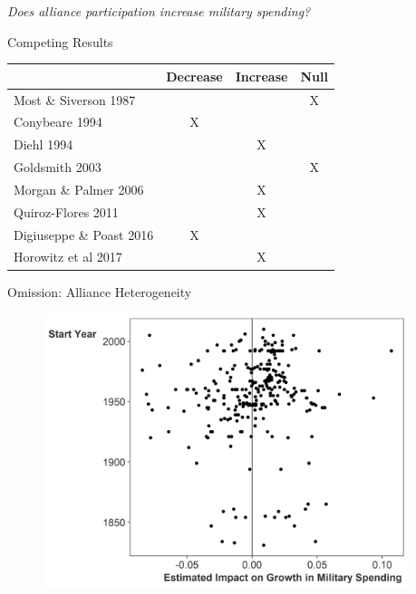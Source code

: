 \documentclass{beamer}
\begin{document}

\begin{frame}[standout]

\huge \textit{Does alliance participation increase military spending?} 

 \end{frame}


\begin{frame}{Competing Results}

\begin{table}[hbt!]
\begin{center}
\begin{tabular}{lccc}
     & Decrease & Increase & Null \\
\hline
Most \& Siverson 1987  &  &  & X \\
Conybeare 1994 & X & &  \\
Diehl 1994 &  & X &  \\
Goldsmith 2003 &  &  & X \\
Morgan \& Palmer 2006 &  & X & \\ 
Quiroz-Flores 2011 &  & X &  \\ 
Digiuseppe \& Poast 2016 & X &  & \\ 
Horowitz et al 2017 &  & X & \\ 
\hline
\end{tabular}
\end{center} 
\end{table}


 \end{frame}


\begin{frame}{Omission: Alliance Heterogeneity}

\begin{figure}
	\centering
		\includegraphics[width=0.95\textwidth]{lambda-est-full.png}
	\label{fig:lambda-est-full}
\end{figure}


 \end{frame}
\end{document}
